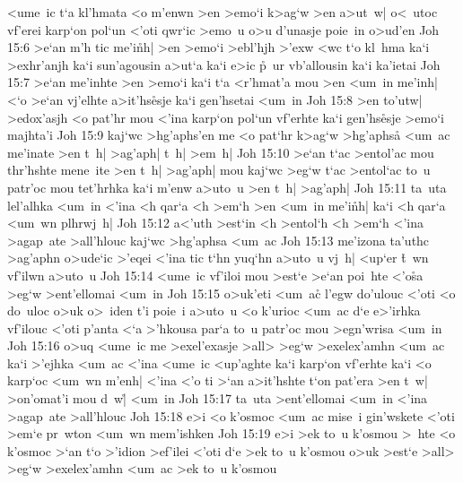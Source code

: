<ume~ic
t`a
kl'hmata
<o
m'enwn
>en
>emo`i
k>ag`w
>en
a>ut~w|
o<~utoc
vf'erei
karp`on
pol`un
<'oti
qwr`ic
>emo~u
o>u
d'unasje
poie~in
o>ud'en\bibvsend
\vs Joh 15:6
>e`an
m'h
tic
me'i\r{n}h|
>en
>emo`i
>ebl'hjh
>'exw
<wc
t`o
kl~hma
ka`i
>exhr'anjh
ka`i
sun'agousin
a>ut`a
ka`i
e>ic
\r{p}~ur
vb'allousin
ka`i
ka'ietai\bibvsend
\vs Joh 15:7
>e`an
me'inhte
>en
>emo`i
ka`i
t`a
<r'hmat'a
mou
>en
<um~in
me'inh|
<`o
>e`an
vj'elhte
a>it'hs\r{e}sje
ka`i
gen'hsetai
<um~in\bibvsend
\vs Joh 15:8
>en
to'utw|
>edox'asjh
<o
pat'hr
mou
<'ina
karp`on
pol`un
vf'erhte
ka`i
gen'hs\r{e}sje
>emo`i
majhta'i\bibvsend
\vs Joh 15:9
kaj`wc
>hg'aphs'en
me
<o
pat`hr
k>ag`w
>hg'aphsa\r{}
<um~ac
me'inate
>en
t~h|
>ag'aph|
t~h|
>em~h|\bibvsend
\vs Joh 15:10
>e`an
t`ac
>entol'ac
mou
thr'hshte
mene~ite
>en
t~h|
>ag'aph|
mou
kaj`wc
>eg`w
t`ac
>entol`ac
to~u
patr'oc
mou
tet'hrhka
ka`i
m'enw
a>uto~u
>en
t~h|
>ag'aph|\bibvsend
\vs Joh 15:11
ta~uta
lel'alhka
<um~in
<'ina
<h
qar`a
<h
>em`h
>en
<um~in
me'i\r{n}h|
ka`i
<h
qar`a
<um~wn
plhrwj~h|\bibvsend
\vs Joh 15:12
a<'uth
>est`in
<h
>entol`h
<h
>em`h
<'ina
>agap~ate
>all'hlouc
kaj`wc
>hg'aphsa
<um~ac\bibvsend
\vs Joh 15:13
me'izona
ta'uthc
>ag'aphn
o>ude`ic
>'eqei
<'ina
tic
t`hn
yuq`hn
a>uto~u
vj~h|
<up`er
\r{t}~wn
vf'ilwn
a>uto~u\bibvsend
\vs Joh 15:14
<ume~ic
vf'iloi
mou
>est`e
>e`an
poi~hte
<'o\r{s}a
>eg`w
>ent'ellomai
<um~in\bibvsend
\vs Joh 15:15
o>uk'eti
<um~ac\r{}
l'egw
do'ulouc
<'oti
<o
do~uloc
o>uk
o>~iden
t'i
poie~i
a>uto~u
<o
k'urioc
<um~ac
d`e
e>'irhka
vf'ilouc
<'oti
p'anta
<`a
>'hkousa
par`a
to~u
patr'oc
mou
>egn'wrisa
<um~in\bibvsend
\vs Joh 15:16
o>uq
<ume~ic
me
>exel'exasje
>all>
>eg`w
>exelex'amhn
<um~ac
ka`i
>'ejhka
<um~ac
<'ina
<ume~ic
<up'aghte
ka`i
karp`on
vf'erhte
ka`i
<o
karp`oc
<um~wn
m'enh|
<'ina
<'o
ti
>`an
a>it'hshte
t`on
pat'era
>en
t~w|
>on'omat'i
mou
d~w|\r{}
<um~in\bibvsend
\vs Joh 15:17
ta~uta
>ent'ellomai
<um~in
<'ina
>agap~ate
>all'hlouc\bibvsend
\vs Joh 15:18
e>i
<o
k'osmoc
<um~ac
mise~i
gin'wskete
<'oti
>em`e
pr~wton
<um~wn
mem'ishken\bibvsend
\vs Joh 15:19
e>i
>ek
to~u
k'osmou
>~hte
<o
k'osmoc
>`an
t`o
>'idion
>ef'ilei
<'oti
d`e
>ek
to~u
k'osmou
o>uk
>est`e
>all>
>eg`w
>exelex'amhn
<um~ac
>ek
to~u
k'osmou
